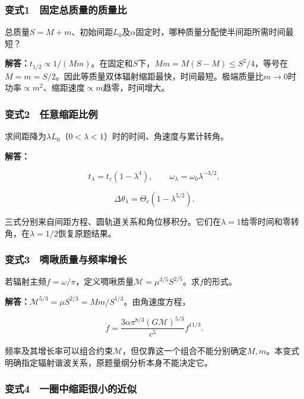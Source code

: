 \documentclass[12pt,a4paper,fontset=fandol]{ctexart}
\begin{document}
\subsubsection{变式1　固定总质量的质量比}\label{ux53d8ux5f0f1-ux56faux5b9aux603bux8d28ux91cfux7684ux8d28ux91cfux6bd4}

总质量\(S=M+m\)、初始间距\(L_0\)及\(\alpha\)固定时，哪种质量分配使半间距所需时间最短？

\textbf{解答：}\(t_{1/2}\propto1/(Mm)\)。在固定和\(S\)下，\(Mm=M(S-M)\leq S^2/4\)，等号在\(M=m=S/2\)。因此等质量双体辐射缩距最快，时间最短。极端质量比\(m\to0\)时功率\(\propto m^2\)、缩距速度\(\propto m\)趋零，时间增大。

\subsubsection{变式2　任意缩距比例}\label{ux53d8ux5f0f2-ux4efbux610fux7f29ux8dddux6bd4ux4f8b}

求间距降为\(\lambda L_0\)（\(0<\lambda<1\)）时的时间、角速度与累计转角。

\textbf{解答：}

\[
t_\lambda=t_c(1-\lambda^4),\qquad
\omega_\lambda=\omega_0\lambda^{-3/2},
\]

\[
\Delta\theta_\lambda=\Theta_c(1-\lambda^{5/2}).
\]

三式分别来自间距方程、圆轨道关系和角位移积分。它们在\(\lambda=1\)给零时间和零转角，在\(\lambda=1/2\)恢复原题结果。

\subsubsection{变式3　啁啾质量与频率增长}\label{ux53d8ux5f0f3-ux5541ux557eux8d28ux91cfux4e0eux9891ux7387ux589eux957f}

若辐射主频\(f=\omega/\pi\)，定义啁啾质量\(\mathcal M=\mu^{3/5}S^{2/5}\)。求\(\dot f\)的形式。

\textbf{解答：}\(\mathcal M^{5/3}=\mu S^{2/3}=Mm/S^{1/3}\)。由角速度方程，

\[
\dot f
=\frac{3\alpha\pi^{8/3}(G\mathcal M)^{5/3}}
{c^5}f^{11/3}.
\]

频率及其增长率可以组合约束\(\mathcal M\)，但仅靠这一个组合不能分别确定\(M,m\)。本变式明确指定辐射谐波关系，原题量纲分析本身不能决定它。

\subsubsection{变式4　一圈中缩距很小的近似}\label{ux53d8ux5f0f4-ux4e00ux5708ux4e2dux7f29ux8dddux5f88ux5c0fux7684ux8fd1ux4f3c}
\end{document}
